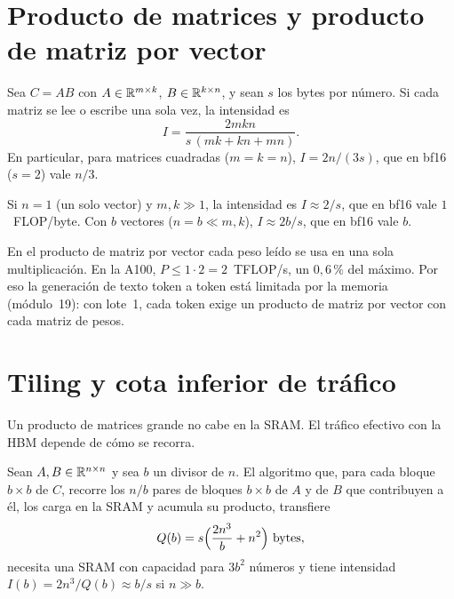 \section{Producto de matrices y producto de matriz por vector}

\begin{proposicion}\label{prop:intensidad-matmul}
Sea $C=AB$ con $A\in\mathbb{R}^{m\times k}$, $B\in\mathbb{R}^{k\times n}$, y sean $s$ los bytes por número. Si cada matriz se lee o escribe una sola vez, la intensidad es
\[
I=\frac{2mkn}{s\,(mk+kn+mn)}.
\]
En particular, para matrices cuadradas ($m=k=n$), $I=2n/(3s)$, que en bf16 ($s=2$) vale $n/3$.
\end{proposicion}

\begin{corolario}\label{cor:matvec}
Si $n=1$ (un solo vector) y $m,k\gg 1$, la intensidad es $I\approx 2/s$, que en bf16 vale $1$~FLOP/byte. Con $b$ vectores ($n=b\ll m,k$), $I\approx 2b/s$, que en bf16 vale $b$.
\end{corolario}

En el producto de matriz por vector cada peso leído se usa en una sola multiplicación. En la A100, $P\le 1\cdot 2=2$~TFLOP/s, un $0{,}6\,\%$ del máximo. Por eso la generación de texto token a token está limitada por la memoria (módulo~19): con lote~1, cada token exige un producto de matriz por vector con cada matriz de pesos.

\addtocounter{definicion}{1}%

\section{Tiling y cota inferior de tráfico}

Un producto de matrices grande no cabe en la SRAM. El tráfico efectivo con la HBM depende de cómo se recorra.

\begin{proposicion}\label{prop:tiling}
Sean $A,B\in\mathbb{R}^{n\times n}$ y sea $b$ un divisor de $n$. El algoritmo que, para cada bloque $b\times b$ de $C$, recorre los $n/b$ pares de bloques $b\times b$ de $A$ y de $B$ que contribuyen a él, los carga en la SRAM y acumula su producto, transfiere
\[
Q(b)=s\Bigl(\frac{2n^{3}}{b}+n^{2}\Bigr)\ \text{bytes},
\]
necesita una SRAM con capacidad para $3b^{2}$ números y tiene intensidad $I(b)=2n^{3}/Q(b)\approx b/s$ si $n\gg b$.
\end{proposicion}

